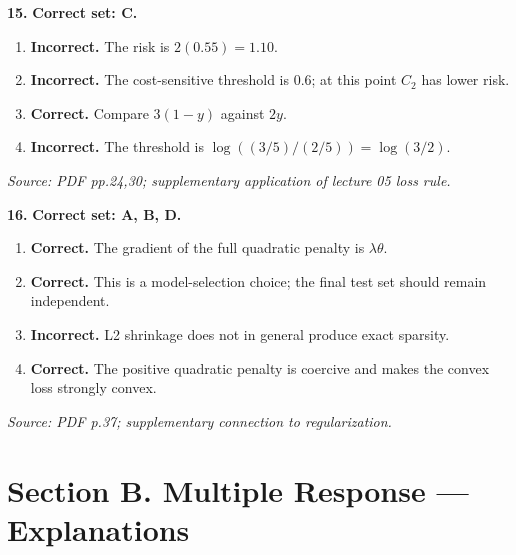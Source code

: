 \documentclass[11pt,a4paper]{article}
\begin{document}
\par\noindent\begin{minipage}{\linewidth}
\textbf{15.} \textbf{Correct set: C.}
\begin{enumerate}[label=(\Alph*),leftmargin=8mm,itemsep=2pt,topsep=2pt]
\item \textbf{Incorrect.} The risk is \(2(0.55)=1.10\).
\item \textbf{Incorrect.} The cost-sensitive threshold is \(0.6\); at this point \(C_2\) has lower risk.
\item \textbf{Correct.} Compare \(3(1-y)\) against \(2y\).
\item \textbf{Incorrect.} The threshold is \(\log((3/5)/(2/5))=\log(3/2)\).
\end{enumerate}
{\footnotesize\textit{Source: PDF pp.24,30; supplementary application of lecture 05 loss rule.}}

\end{minipage}\par\vspace{3mm}
\par\noindent\begin{minipage}{\linewidth}
\textbf{16.} \textbf{Correct set: A, B, D.}
\begin{enumerate}[label=(\Alph*),leftmargin=8mm,itemsep=2pt,topsep=2pt]
\item \textbf{Correct.} The gradient of the full quadratic penalty is \(\lambda\theta\).
\item \textbf{Correct.} This is a model-selection choice; the final test set should remain independent.
\item \textbf{Incorrect.} L2 shrinkage does not in general produce exact sparsity.
\item \textbf{Correct.} The positive quadratic penalty is coercive and makes the convex loss strongly convex.
\end{enumerate}
{\footnotesize\textit{Source: PDF p.37; supplementary connection to regularization.}}

\end{minipage}\par\vspace{3mm}
\newpage\section*{Section B. Multiple Response --- Explanations}
\end{document}
